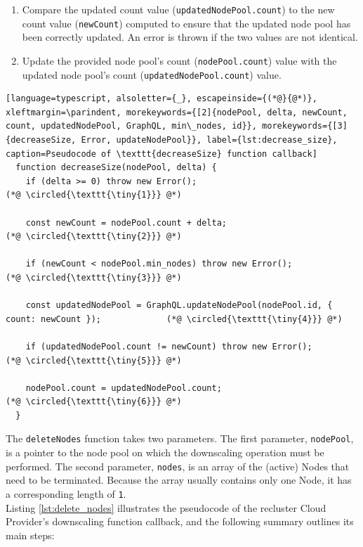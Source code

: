\begin{enumerate}[label=\protect\circled{\arabic{*}}]
  \item Compare the updated count value (\texttt{updatedNodePool.count}) to the
    new count value (\texttt{newCount}) computed to ensure that the updated node
    pool has been correctly updated. An error is thrown if the two values are
    not identical.

  \item Update the provided node pool's count (\texttt{nodePool.count}) value
    with the updated node pool's count (\texttt{updatedNodePool.count}) value.
\end{enumerate}

\begin{lstlisting}[language=typescript, alsoletter={_}, escapeinside={(*@}{@*)}, xleftmargin=\parindent, morekeywords={[2]{nodePool, delta, newCount, count, updatedNodePool, GraphQL, min\_nodes, id}}, morekeywords={[3]{decreaseSize, Error, updateNodePool}}, label={lst:decrease_size}, caption=Pseudocode of \texttt{decreaseSize} function callback]
  function decreaseSize(nodePool, delta) {
    if (delta >= 0) throw new Error();                                                            (*@ \circled{\texttt{\tiny{1}}} @*)

    const newCount = nodePool.count + delta;                                                      (*@ \circled{\texttt{\tiny{2}}} @*)

    if (newCount < nodePool.min_nodes) throw new Error();                                         (*@ \circled{\texttt{\tiny{3}}} @*)

    const updatedNodePool = GraphQL.updateNodePool(nodePool.id, { count: newCount });             (*@ \circled{\texttt{\tiny{4}}} @*)

    if (updatedNodePool.count != newCount) throw new Error();                                     (*@ \circled{\texttt{\tiny{5}}} @*)

    nodePool.count = updatedNodePool.count;                                                       (*@ \circled{\texttt{\tiny{6}}} @*)
  }
\end{lstlisting}

The \texttt{deleteNodes} function takes two parameters. The first parameter, \texttt{nodePool},
is a pointer to the node pool on which the downscaling operation must be performed.
The second parameter, \texttt{nodes}, is an array of the (active) Nodes that need
to be terminated. Because the array usually contains only one Node, it has a corresponding
length of \texttt{1}. \\ %
Listing \ref{lst:delete_nodes} illustrates the pseudocode of the recluster Cloud
Provider's downscaling function callback, and the following summary outlines its
main steps:

